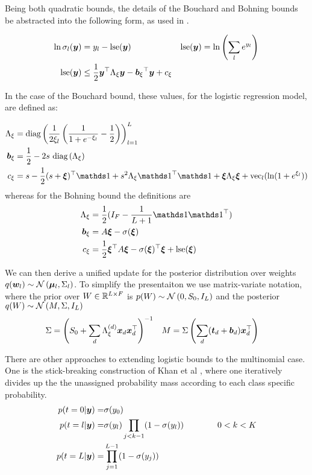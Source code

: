 Being both quadratic bounds, the details of the Bouchard and Bohning bounds be abstracted into the following form, as used in \cite{Khan2010}.

\begin{align}
\ln \sigma_l(\bm y) & = y_l - \text{lse} (\bm y) & \text{lse} (\bm y) & = \ln \left(\sum_l e^{y_l} \right)\\
\text{lse}(\bm y) & \leq \frac{1}{2} \bm y^\top { \Lambda_{\xi} } \bm y - { \bm b_{\xi} }^\top\bm y + { c_{\xi} }
\end{align}

In the case of the Bouchard bound, these values, for the logistic regression model, are defined as:

\begin{align}
\Axi & = \diag{\frac{1}{2\xi_l} \left( \frac{1}{1 + e^{-\xi_l}} - \half\right) }_{l=1}^L  \\
\bxi & = \half - 2 s \text{ }\diag{\Axi} \\
\cxi & = s - \half (s + \vv{\xi})\T\one + s^2\Axi \one\T\one + \vv{\xi}\Axi\vv{\xi} + \text{vec}_l(\ln (1 + e^{\xi_l}))
\end{align}
whereas for the Bohning bound the definitions are
\begin{align}
\Axi & = \half (I_F - \frac{1}{L+1} \one \one \T) \\
\bxi & = A \vv{\xi} - \sigma(\vv{\xi})\\
\cxi & = \half \vv{\xi}\T A \vv{\xi} - \sigma(\vv{\xi})\T\vv{\xi} + \lse(\vv{\xi})
\end{align}

We can then derive a unified update for the posterior distribution over weights $q(\bm w_l) \sim \mathcal{N} \left( {\bm \mu_l}, {\Sigma_l} \right)$. To simplify the presentaiton we use matrix-variate notation, where the prior over $W \in { \mathbb{R}^{L \times F} }$ is $p(W) \sim \mathcal{N} \left(0, S_0, I_L\right)$ and the posterior $q(W) \sim \mathcal{N} \left(M, \Sigma, I_L\right)$
\begin{align}
\Sigma &= {\left( S_0 + \sum_d \Lambda_\xi^{(d)}\bm x_d\bm x_d^\top \right)}^{-1} & M &= \Sigma \left(\sum_d (\bm t_d + \bm b_d)\bm x_d^\top\right)
\end{align}


\newcommand \C { \mathcal{C} }

There are other approaches to extending logistic bounds to the multinomial case. One is the stick-breaking construction of Khan et al \cite{Khan2012stick}, where one iteratively divides up the the unassigned probability mass according to each class specific probability.
\begin{align}
\begin{split}
p(t = 0 | \bm y) = & \sigma(y_0) \\
p(t = l | \bm y) = & \sigma(y_l) \prod_{j < k - 1} (1 - \sigma(y_l)) \qquad\qquad 0 < k < K \\
p (t = L | \bm y) = & \prod_{j = 1}^{L - 1} (1 - \sigma(y_j))
\end{split}
\end{align}


